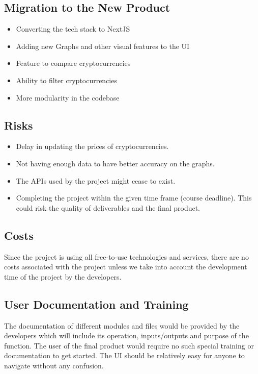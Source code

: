 \documentclass[12pt, titlepage]{article}
\begin{document}
\subsection{Migration to the New Product}
\begin{itemize}
    \item Converting the tech stack to NextJS
    \item Adding new Graphs and other visual features to the UI
    \item Feature to compare cryptocurrencies
    \item Ability to filter cryptocurrencies
    \item More modularity in the codebase
\end{itemize}

\subsection{Risks}
\begin{itemize}
    \item Delay in updating the prices of cryptocurrencies.
    \item Not having enough data to have better accuracy on the graphs.
    \item The APIs used by the project might cease to exist.
    \item Completing the project within the given time frame (course deadline). This could risk the quality of deliverables and the final product. 
\end{itemize}

\subsection{Costs}
Since the project is using all free-to-use technologies and services, there are no costs associated with the project unless we take into account the development time of the project by the developers. 

\subsection{User Documentation and Training}
The documentation of different modules and files would be provided by the developers which will include its operation, inputs/outputs and purpose of the function. The user of the final product would require no such special training or documentation to get started. The UI should be relatively easy for anyone to navigate without any confusion.
\end{document}
